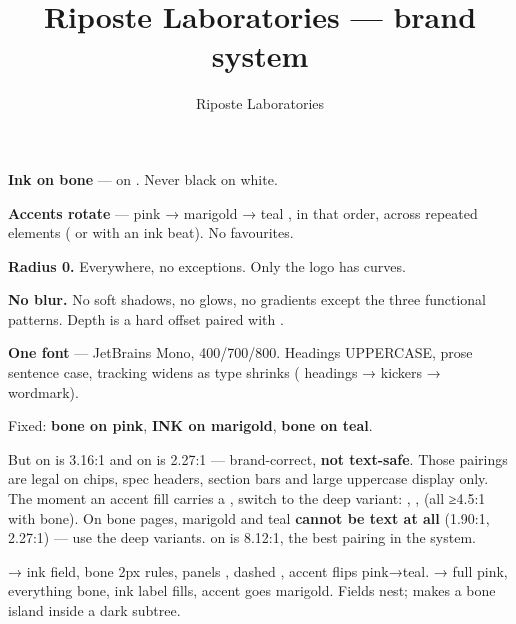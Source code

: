 \documentclass[fontpath=fonts/,logopath=logo/]{riposte-doc}
\title{Riposte Laboratories — brand system}
\author{Riposte Laboratories}
\date{}
\begin{document}
\ripmakehead

\riptoc



\begin{ripnumbers}
\item \textbf{Ink on bone} —  on . Never black on white.
\item \textbf{Accents rotate} — pink  → marigold  → teal , in that order, across repeated elements ( or  with an ink beat). No favourites.
\item \textbf{Radius 0.} Everywhere, no exceptions. Only the logo has curves.
\item \textbf{No blur.} No soft shadows, no glows, no gradients except the three functional patterns. Depth is a hard  offset paired with .
\item \textbf{One font} — JetBrains Mono, 400/700/800. Headings UPPERCASE, prose sentence case, tracking widens as type shrinks (\ripmono{.03em} headings → \ripmono{.3em} kickers → \ripmono{.55em} wordmark).
\end{ripnumbers}



Fixed: \textbf{bone on pink}, \textbf{INK on marigold}, \textbf{bone on teal}.

But  on  is 3.16:1 and  on  is 2.27:1 — brand-correct, \textbf{not text-safe}. Those pairings are legal on chips, spec headers, section bars and large uppercase display only. The moment an accent fill carries a , switch to the deep variant: , ,  (all ≥4.5:1 with bone). On bone pages, marigold and teal \textbf{cannot be text at all} (1.90:1, 2.27:1) — use the deep variants.  on  is 8.12:1, the best pairing in the system.



 → ink field, bone 2px rules, panels , dashed , accent flips pink→teal.  → full pink, everything bone, ink label fills, accent goes marigold. Fields nest;  makes a bone island inside a dark subtree.
\end{document}
